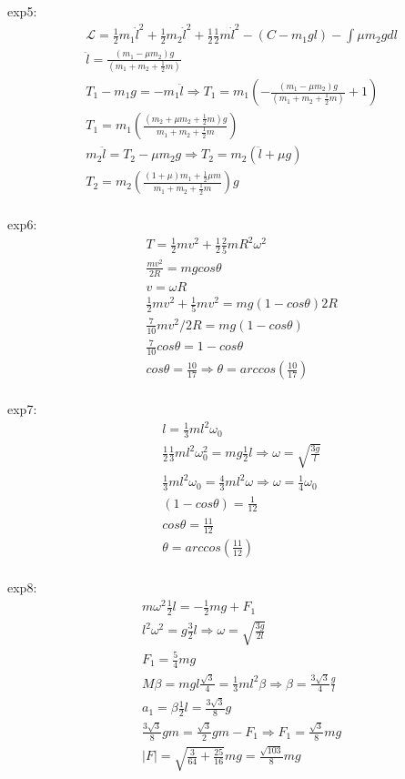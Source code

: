 \documentclass{article}
\begin{document}
exp5:
\begin{align*}
&\mathcal L=\frac12m_1\dot l^2+\frac12m_2\dot l^2+\frac12\frac12m\dot l^2-(C-m_1gl)-\int \mu m_2g dl \\
&\ddot l=\frac{(m_1 -\mu m_2)g}{(m_1+m_2+\frac12 m)} \\
&T_1-m_1g=-m_1\ddot l\Rightarrow T_1=m_1(-\frac{(m_1 -\mu m_2)g}{(m_1+m_2+\frac12 m)}+1) \\
&T_1=m_1(\frac{(m_2+\mu m_2 +\frac12 m)g}{m_1+m_2+\frac12m}) \\
&m_2\ddot l=T_2-\mu m_2g \Rightarrow T_2=m_2(\ddot l+\mu g)\\
&T_2=m_2(\frac{(1+\mu)m_1+\frac12\mu m}{m_1+m_2+\frac12m})g \\
\end{align*}

exp6:
\begin{align*}
  &T=\frac12mv^2+\frac12\frac25mR^2\omega^2 \\
  &\frac{mv^2}{2R}=mgcos\theta \\
  &v=\omega R \\
  &\frac12mv^2+\frac15mv^2=mg(1-cos\theta)2R \\
  &\frac{7}{10}mv^2/2R=mg(1-cos\theta) \\
  &\frac{7}{10}cos\theta=1-cos\theta \\
  &cos\theta=\frac{10}{17}\Rightarrow \theta=arccos(\frac{10}{17}) \\
\end{align*}

exp7:
\begin{align*}
&l=\frac13ml^2\omega_0 \\
&\frac12\frac13ml^2\omega_0^2=mg\frac12l\Rightarrow \omega=\sqrt{\frac{3g}l} \\
&\frac13ml^2\omega_0=\frac43ml^2\omega\Rightarrow \omega=\frac14\omega_0 \\
&(1-cos\theta)=\frac1{12}\\
&cos\theta =\frac{11}{12} \\
&\theta =arccos(\frac{11}{12}) \\
\end{align*}

exp8:
\begin{align*}
&m\omega^2\frac12l=-\frac12mg+F_1 \\
&l^2\omega^2=g\frac32l\Rightarrow \omega=\sqrt{\frac{3g}{2l}} \\
&F_1=\frac54mg\\
&M\beta=mgl\frac{\sqrt{3}}4=\frac13ml^2\beta\Rightarrow \beta=\frac{3\sqrt{3}}4\frac{g}l \\
&a_1=\beta \frac12l=\frac{3\sqrt{3}}8g \\
&\frac{3\sqrt{3}}8gm=\frac{\sqrt{3}}2gm-F_1\Rightarrow F_1=\frac{\sqrt{3}}8mg \\
&|F|=\sqrt{\frac3{64}+\frac{25}{16}}mg=\frac{\sqrt{103}}8mg \\
\end{align*}
\end{document}
